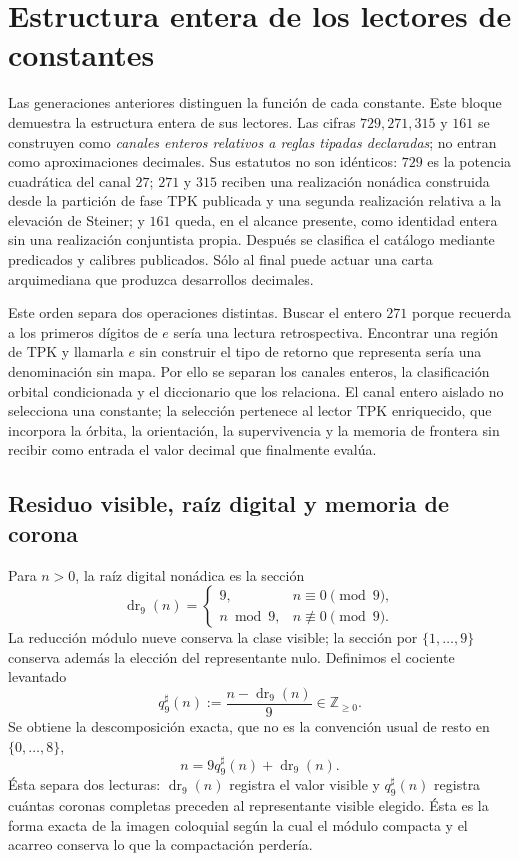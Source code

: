 \chapter{Estructura entera de los lectores de constantes}
\label{chap:canales-enteros-constantes}

Las generaciones anteriores distinguen la función de cada constante. Este
bloque demuestra la estructura entera de sus lectores. Las cifras
\(729,271,315\) y \(161\) se construyen como \emph{canales enteros relativos
a reglas tipadas declaradas}; no entran como aproximaciones decimales. Sus
estatutos no son idénticos: \(729\) es la potencia cuadrática del canal
\(27\); \(271\) y \(315\) reciben una realización nonádica construida desde
la partición de fase TPK publicada y una segunda realización relativa a la elevación de
Steiner; y
\(161\) queda, en el alcance presente, como identidad entera sin una
realización conjuntista propia. Después se clasifica el catálogo mediante
predicados y calibres publicados. Sólo al final puede actuar una carta
arquimediana que produzca desarrollos decimales.

Este orden separa dos operaciones distintas. Buscar el entero \(271\)
porque recuerda a los primeros dígitos de \(e\) sería una lectura
retrospectiva. Encontrar una región de TPK y llamarla \(e\) sin construir el
tipo de retorno que representa sería una denominación sin mapa. Por ello se
separan los canales enteros, la clasificación orbital condicionada y el
diccionario que los relaciona. El canal entero aislado no selecciona una
constante; la selección pertenece al lector TPK enriquecido, que incorpora
la órbita, la orientación, la supervivencia y la memoria de frontera sin
recibir como entrada el valor decimal que finalmente evalúa.

\section{Residuo visible, raíz digital y memoria de corona}

Para \(n>0\), la raíz digital nonádica es la sección
\[
 \operatorname{dr}_9(n)
 =\begin{cases}
 9,&n\equiv0\pmod9,\\
 n\bmod9,&n\not\equiv0\pmod9.
 \end{cases}
\]
La reducción módulo nueve conserva la clase visible; la sección por
\(\{1,\ldots,9\}\) conserva además la elección del representante nulo.
Definimos el cociente levantado
\[
 q_9^\sharp(n):=\frac{n-\operatorname{dr}_9(n)}9
 \in\mathbb Z_{\geq0}.
\]
Se obtiene la descomposición exacta, que no es la convención usual de resto
en \(\{0,\ldots,8\}\),
\[
 n=9q_9^\sharp(n)+\operatorname{dr}_9(n).
\]
Ésta separa dos lecturas: \(\operatorname{dr}_9(n)\) registra el valor
visible y \(q_9^\sharp(n)\) registra cuántas coronas completas preceden al
representante visible elegido. Ésta es la forma exacta de la imagen
coloquial según la cual el módulo compacta y el acarreo conserva lo que la
compactación perdería.

